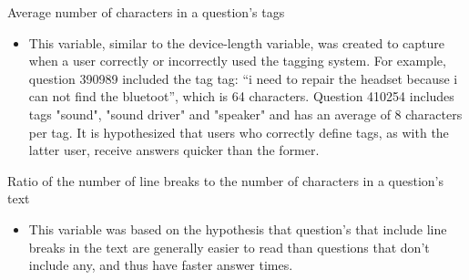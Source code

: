 \documentclass{article}
\begin{document}

Average number of characters in a question's tags

\begin{itemize}
  \item This variable, similar to the device-length variable, was created to capture when a user correctly or incorrectly used the tagging system. For example, question 390989 included the tag tag: “i need to repair the headset because i can not find the bluetoot”, which is 64 characters. Question 410254 includes tags "sound", "sound driver" and "speaker" and has an average of 8 characters per tag. It is hypothesized that users who correctly define tags, as with the latter user, receive answers quicker than the former. 
\end{itemize}


Ratio of the number of line breaks to the number of characters in a question's text

\begin{itemize}
  \item This variable was based on the hypothesis that question's that include line breaks in the text are generally easier to read than questions that don't include any, and thus have faster answer times. 
\end{itemize}





\end{document}
